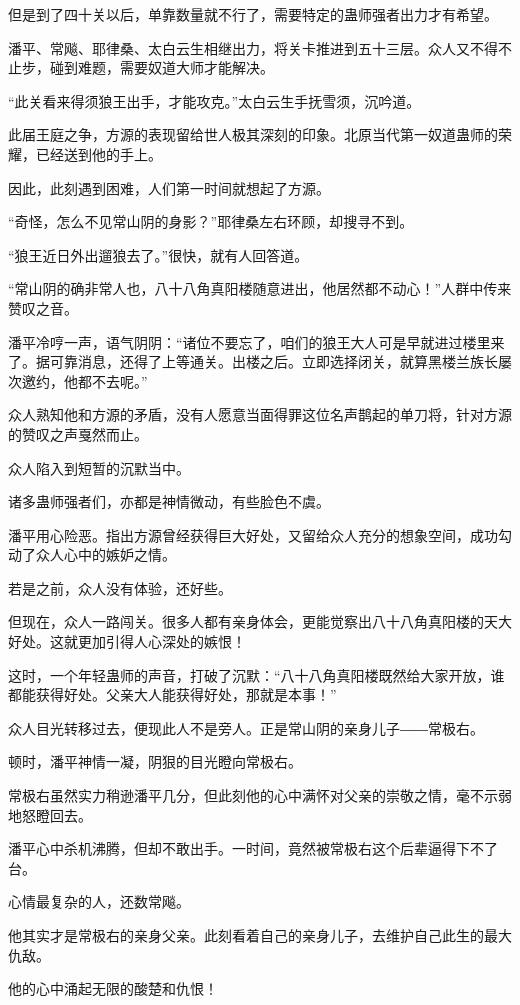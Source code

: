\begin{this_body}
但是到了四十关以后，单靠数量就不行了，需要特定的蛊师强者出力才有希望。

潘平、常飚、耶律桑、太白云生相继出力，将关卡推进到五十三层。众人又不得不止步，碰到难题，需要奴道大师才能解决。

“此关看来得须狼王出手，才能攻克。”太白云生手抚雪须，沉吟道。

此届王庭之争，方源的表现留给世人极其深刻的印象。北原当代第一奴道蛊师的荣耀，已经送到他的手上。

因此，此刻遇到困难，人们第一时间就想起了方源。

“奇怪，怎么不见常山阴的身影？”耶律桑左右环顾，却搜寻不到。

“狼王近日外出遛狼去了。”很快，就有人回答道。

“常山阴的确非常人也，八十八角真阳楼随意进出，他居然都不动心！”人群中传来赞叹之音。

潘平冷哼一声，语气阴阴：“诸位不要忘了，咱们的狼王大人可是早就进过楼里来了。据可靠消息，还得了上等通关。出楼之后。立即选择闭关，就算黑楼兰族长屡次邀约，他都不去呢。”

众人熟知他和方源的矛盾，没有人愿意当面得罪这位名声鹊起的单刀将，针对方源的赞叹之声戛然而止。

众人陷入到短暂的沉默当中。

诸多蛊师强者们，亦都是神情微动，有些脸色不虞。

潘平用心险恶。指出方源曾经获得巨大好处，又留给众人充分的想象空间，成功勾动了众人心中的嫉妒之情。

若是之前，众人没有体验，还好些。

但现在，众人一路闯关。很多人都有亲身体会，更能觉察出八十八角真阳楼的天大好处。这就更加引得人心深处的嫉恨！

这时，一个年轻蛊师的声音，打破了沉默：“八十八角真阳楼既然给大家开放，谁都能获得好处。父亲大人能获得好处，那就是本事！”

众人目光转移过去，便现此人不是旁人。正是常山阴的亲身儿子――常极右。

顿时，潘平神情一凝，阴狠的目光瞪向常极右。

常极右虽然实力稍逊潘平几分，但此刻他的心中满怀对父亲的崇敬之情，毫不示弱地怒瞪回去。

潘平心中杀机沸腾，但却不敢出手。一时间，竟然被常极右这个后辈逼得下不了台。

心情最复杂的人，还数常飚。

他其实才是常极右的亲身父亲。此刻看着自己的亲身儿子，去维护自己此生的最大仇敌。

他的心中涌起无限的酸楚和仇恨！


\end{this_body}
